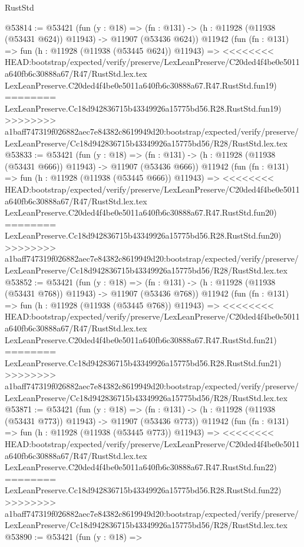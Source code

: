 \begin{lexlean}{RustStd}
\begin{coremodule}
{\begin{coremodule}
{{{{{{{{{{{{{{{{{{{{{{{{{{{{{{{{{{{{{{{{{{{{{{{{{{{{{{{{{{{{{{{{{{{{{{{{{{{{{{{{@53814 := @53421
    (fun (y : @18) =>
    (fn : @131) -> (h : @11928 (@11938 (@53431 @624)) @11943) -> @11907 (@53436 @624))
    @11942
    (fun (fn : @131) =>
    fun (h : @11928 (@11938 (@53445 @624)) @11943) =>
<<<<<<<< HEAD:bootstrap/expected/verify/preserve/LexLeanPreserve/C20ded4f4be0e5011a640fb6c30888a67/R47/RustStd.lex.tex
    LexLeanPreserve.C20ded4f4be0e5011a640fb6c30888a67.R47.RustStd.fun19)
========
    LexLeanPreserve.Cc18d942836715b43349926a15775bd56.R28.RustStd.fun19)
>>>>>>>> a1baff747319f026882aec7e84382c8619949d20:bootstrap/expected/verify/preserve/LexLeanPreserve/Cc18d942836715b43349926a15775bd56/R28/RustStd.lex.tex
@53833 := @53421
    (fun (y : @18) =>
    (fn : @131) -> (h : @11928 (@11938 (@53431 @666)) @11943) -> @11907 (@53436 @666))
    @11942
    (fun (fn : @131) =>
    fun (h : @11928 (@11938 (@53445 @666)) @11943) =>
<<<<<<<< HEAD:bootstrap/expected/verify/preserve/LexLeanPreserve/C20ded4f4be0e5011a640fb6c30888a67/R47/RustStd.lex.tex
    LexLeanPreserve.C20ded4f4be0e5011a640fb6c30888a67.R47.RustStd.fun20)
========
    LexLeanPreserve.Cc18d942836715b43349926a15775bd56.R28.RustStd.fun20)
>>>>>>>> a1baff747319f026882aec7e84382c8619949d20:bootstrap/expected/verify/preserve/LexLeanPreserve/Cc18d942836715b43349926a15775bd56/R28/RustStd.lex.tex
@53852 := @53421
    (fun (y : @18) =>
    (fn : @131) -> (h : @11928 (@11938 (@53431 @768)) @11943) -> @11907 (@53436 @768))
    @11942
    (fun (fn : @131) =>
    fun (h : @11928 (@11938 (@53445 @768)) @11943) =>
<<<<<<<< HEAD:bootstrap/expected/verify/preserve/LexLeanPreserve/C20ded4f4be0e5011a640fb6c30888a67/R47/RustStd.lex.tex
    LexLeanPreserve.C20ded4f4be0e5011a640fb6c30888a67.R47.RustStd.fun21)
========
    LexLeanPreserve.Cc18d942836715b43349926a15775bd56.R28.RustStd.fun21)
>>>>>>>> a1baff747319f026882aec7e84382c8619949d20:bootstrap/expected/verify/preserve/LexLeanPreserve/Cc18d942836715b43349926a15775bd56/R28/RustStd.lex.tex
@53871 := @53421
    (fun (y : @18) =>
    (fn : @131) -> (h : @11928 (@11938 (@53431 @773)) @11943) -> @11907 (@53436 @773))
    @11942
    (fun (fn : @131) =>
    fun (h : @11928 (@11938 (@53445 @773)) @11943) =>
<<<<<<<< HEAD:bootstrap/expected/verify/preserve/LexLeanPreserve/C20ded4f4be0e5011a640fb6c30888a67/R47/RustStd.lex.tex
    LexLeanPreserve.C20ded4f4be0e5011a640fb6c30888a67.R47.RustStd.fun22)
========
    LexLeanPreserve.Cc18d942836715b43349926a15775bd56.R28.RustStd.fun22)
>>>>>>>> a1baff747319f026882aec7e84382c8619949d20:bootstrap/expected/verify/preserve/LexLeanPreserve/Cc18d942836715b43349926a15775bd56/R28/RustStd.lex.tex
@53890 := @53421
    (fun (y : @18) =>
}}}}}}}}}}}}}}}}}}}}}}}}}}}}}}}}}}}}}}}}}}}}}}}}}}}}}}}}}}}}}}}}}}}}}}}}}}}}}}}}
\end{coremodule}}
\end{coremodule}
\end{lexlean}
